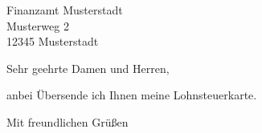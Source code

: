 \documentclass[DIN,fromalign=right,fromfax=true,%
fromphone=true]{scrlttr2}
\begin{document}
\begin{letter}{Finanzamt Musterstadt \\%
Musterweg 2\\12345 Musterstadt}
\opening{Sehr geehrte Damen und Herren,}
anbei Übersende ich Ihnen meine Lohnsteuerkarte.
\closing{Mit freundlichen Grüßen}
\end{letter}
\end{document}
